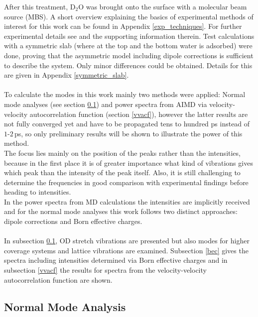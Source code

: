 \documentclass[11pt,DIV=13,BCOR=5mm,a4paper,headinclude]{scrbook}
\begin{document}
After this treatment, D$_2$O was brought onto the surface with a molecular beam source (MBS).
A short overview explaining the basics of experimental methods of interest for this work can be found in Appendix \ref{exp_techniques}.
For further experimental details see \cite{Heiden11-20_2018} and the supporting information therein.
Test calculations with a symmetric slab (where at the top and the bottom water is adsorbed) were done, proving that the asymmetric model including dipole corrections is sufficient to describe the system.
Only minor differences could be obtained.
Details for this are given in Appendix \ref{symmetric_slab}.
\\
\\
To calculate the modes in this work mainly two methods were applied: Normal mode analyses (see section \ref{nma}) and power spectra from AIMD via velocity-velocity autocorrelation function (section \ref{vvacf}), however the latter results are not fully converged yet and have to be propagated tens to hundred ps instead of $1$-$2\,$ps, so only preliminary results will be shown to illustrate the power of this method.
\\
The focus lies mainly on the position of the peaks rather than the intensities, because in the first place it is of greater importance what kind of vibrations gives which peak than the intensity of the peak itself.
Also, it is still challenging to determine the frequencies in good comparison with experimental findings before heading to intensities.
\\
In the power spectra from MD calculations the intensities are implicitly received and for the normal mode analyses this work follows two distinct approaches: dipole corrections and Born effective charges.
\\\\
In subsection \ref{nma}, OD stretch vibrations are presented but also modes for higher coverage systems and lattice vibrations are examined.
Subsection \ref{bec} gives the spectra including intensities determined via Born effective charges and in subsection \ref{vvacf} the results for spectra from the velocity-velocity autocorrelation function are shown.

\subsection{Normal Mode Analysis}\label{nma}
\end{document}
